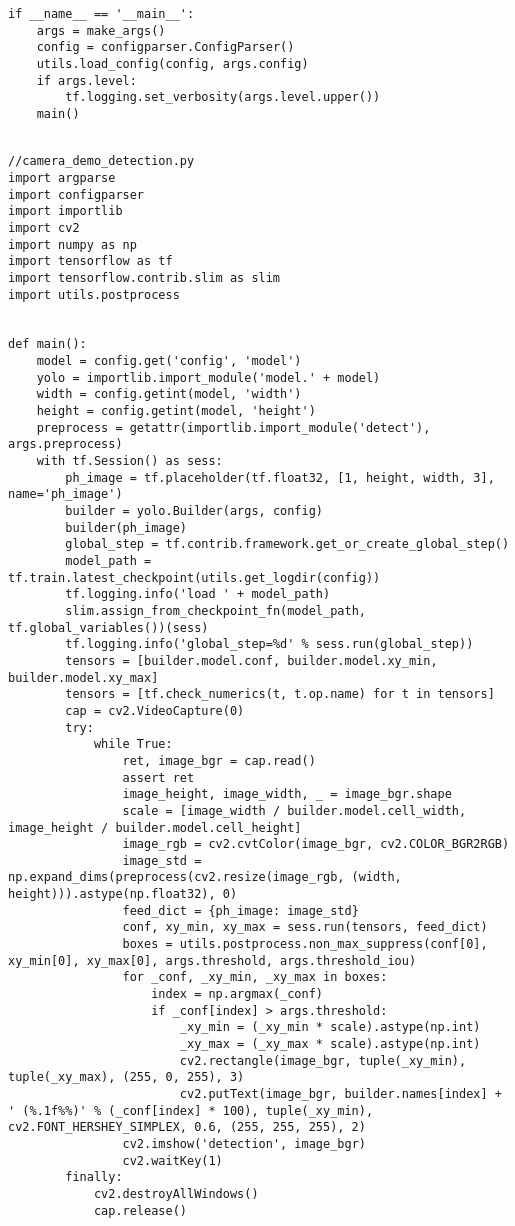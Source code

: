 \begin{lstlisting}
if __name__ == '__main__':
    args = make_args()
    config = configparser.ConfigParser()
    utils.load_config(config, args.config)
    if args.level:
        tf.logging.set_verbosity(args.level.upper())
    main()


\end{lstlisting}

\pagebreak
\begin{lstlisting}
//camera_demo_detection.py
import argparse
import configparser
import importlib
import cv2
import numpy as np
import tensorflow as tf
import tensorflow.contrib.slim as slim
import utils.postprocess


def main():
    model = config.get('config', 'model')
    yolo = importlib.import_module('model.' + model)
    width = config.getint(model, 'width')
    height = config.getint(model, 'height')
    preprocess = getattr(importlib.import_module('detect'), args.preprocess)
    with tf.Session() as sess:
        ph_image = tf.placeholder(tf.float32, [1, height, width, 3], name='ph_image')
        builder = yolo.Builder(args, config)
        builder(ph_image)
        global_step = tf.contrib.framework.get_or_create_global_step()
        model_path = tf.train.latest_checkpoint(utils.get_logdir(config))
        tf.logging.info('load ' + model_path)
        slim.assign_from_checkpoint_fn(model_path, tf.global_variables())(sess)
        tf.logging.info('global_step=%d' % sess.run(global_step))
        tensors = [builder.model.conf, builder.model.xy_min, builder.model.xy_max]
        tensors = [tf.check_numerics(t, t.op.name) for t in tensors]
        cap = cv2.VideoCapture(0)
        try:
            while True:
                ret, image_bgr = cap.read()
                assert ret
                image_height, image_width, _ = image_bgr.shape
                scale = [image_width / builder.model.cell_width, image_height / builder.model.cell_height]
                image_rgb = cv2.cvtColor(image_bgr, cv2.COLOR_BGR2RGB)
                image_std = np.expand_dims(preprocess(cv2.resize(image_rgb, (width, height))).astype(np.float32), 0)
                feed_dict = {ph_image: image_std}
                conf, xy_min, xy_max = sess.run(tensors, feed_dict)
                boxes = utils.postprocess.non_max_suppress(conf[0], xy_min[0], xy_max[0], args.threshold, args.threshold_iou)
                for _conf, _xy_min, _xy_max in boxes:
                    index = np.argmax(_conf)
                    if _conf[index] > args.threshold:
                        _xy_min = (_xy_min * scale).astype(np.int)
                        _xy_max = (_xy_max * scale).astype(np.int)
                        cv2.rectangle(image_bgr, tuple(_xy_min), tuple(_xy_max), (255, 0, 255), 3)
                        cv2.putText(image_bgr, builder.names[index] + ' (%.1f%%)' % (_conf[index] * 100), tuple(_xy_min), cv2.FONT_HERSHEY_SIMPLEX, 0.6, (255, 255, 255), 2)
                cv2.imshow('detection', image_bgr)
                cv2.waitKey(1)
        finally:
            cv2.destroyAllWindows()
            cap.release()



\end{lstlisting}
